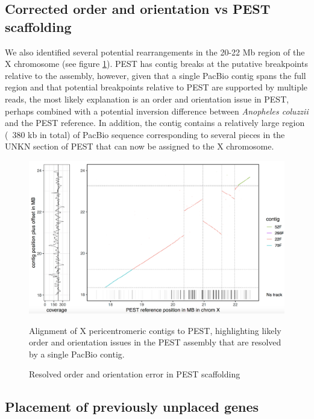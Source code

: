 {\subsection{Corrected order and orientation vs PEST scaffolding}

\par{
We also identified several potential rearrangements in the 20-22 Mb region of the X chromosome (see figure \ref{figure:x_inversion}). PEST has contig breaks at the putative breakpoints relative to the assembly, however, given that a single PacBio contig spans the full region and that potential breakpoints relative to PEST are supported by multiple reads, the most likely explanation is an order and orientation issue in PEST, perhaps combined with a potential inversion difference between \textit{Anopheles coluzzii} and the PEST reference. In addition, the contig contains a relatively large region (~380 kb in total) of PacBio sequence corresponding to several pieces in the UNKN section of PEST that can now be assigned to the X chromosome.
}

\begin{figure}[htbp!]

\caption{Resolved order and orientation error in PEST scaffolding}
\label{figure:x_inversion}
\begin{centering}
\includegraphics[width=1.0\textwidth]{x_inversion.png}
\par{Alignment of X pericentromeric contigs to PEST, highlighting likely order and orientation issues in the PEST assembly that are resolved by a single PacBio contig.}
\end{centering}
\end{figure}



\subsection{Placement of previously unplaced genes}\label{section:unkn}

}
